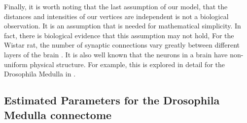 \documentclass[11]{article}
\newcommand{\sanote}{\todo[color=violet!30]}
\theoremstyle{remark}
\theoremstyle{definition}
\newtheorem{rmk}[thm]{Remark}
\begin{document}
Finally, it is worth noting that the last assumption of our model, that the distances and intensities of our vertices are independent is not a biological observation. It is an assumption that is needed for mathematical simplicity. In fact, there is biological evidence that this assumption may not hold, For the Wistar rat, the number of synaptic connections vary greatly between different layers of the brain \cite{synapesedistribution}. It is also well known that the neurons in a brain have non-uniform physical structure. For example, this is explored in detail for the Drosophila Medulla in \cite{generalconnection}. 





\subsection{Estimated Parameters for the Drosophila Medulla connectome \label{sec:modelparams}} 


\end{document}
